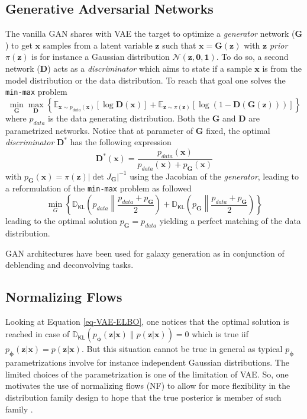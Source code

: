 \documentclass[11pt]{amsart}
\newcommand{\Esp}[0]{\ensuremath{\mathbb{E}}}
\newcommand{\DKL}[0]{\ensuremath{\mathbb{D}_{\mathsf{KL}}}}
\begin{document}
\subsection{Generative Adversarial Networks}
%
The vanilla GAN \citep{goodfellow2014generative} shares with VAE the target to optimize a \textit{generator} network ($\bm{G}$) to get $\bm{x}$ samples from a latent variable $\bm{z}$ such that  $\bm{x} = \bm{G}(\bm{z})$ with $\bm{z}$ \textit{prior} $\pi(\bm{z})$ is for instance a Gaussian distribution $\mathcal{N}(\bm{z},\bm{0},\bm{1})$. To do so, a second network ($\bm{D}$) acts as a \textit{discriminator} which aims to state if a sample $\bm{x}$ is from the model distribution or the data distribution. To reach that goal one solves the \texttt{min-max} problem
\begin{equation}
\min_{\bm{G}} \max_{\bm{D}}\left\{ \Esp_{\bm{x}\sim p_{data}(\bm{x})}[\log \bm{D}(\bm{x})] + \Esp_{\bm{z}\sim \pi(\bm{z})}[\log(1-\bm{D}(\bm{G}(\bm{z})))] \right\}
\end{equation} 
where $p_{data}$ is the data generating distribution. Both the  $\bm{G}$ and $\bm{D}$ are parametrized networks. Notice that at parameter of $\bm{G}$ fixed, the optimal \textit{discriminator} $\bm{D}^\ast$ has the following expression
\begin{equation}
\bm{D}^\ast(\bm{x}) = \frac{p_{data}(\bm{x})}{p_{data}(\bm{x}) + p_{\bm{G}}(\bm{x})}
\end{equation}
with $p_{\bm{G}}(\bm{x}) = \pi(\bm{z})|\det J_{\bm{G}} |^{-1}$ using the Jacobian of the \textit{generator}, leading to a reformulation of the \texttt{min-max} problem as followed
\begin{equation}
\min_G \left\{ \DKL{\left( p_{data} \left\| \frac{p_{data} + p_{\bm{G}}}{2}\right. \right) }  + \DKL{\left(p_{\bm{G}} \left\| \frac{p_{data} + p_{\bm{G}}}{2} \right. \right)} \right\}
\end{equation}
leading to the optimal solution $p_{\bm{G}} = p_{data}$ yielding a perfect matching of the data distribution. 

GAN architectures have been used for galaxy generation as \citep[e.g.][]{Schawinski2017,Coccomini2021,Hemmati_2022} in conjunction of deblending and deconvolving tasks. 
%
\subsection{Normalizing Flows}
%
Looking at Equation \ref{eq-VAE-ELBO}, one notices that the optimal solution is reached in case of $\DKL(p_{\bm{\phi}}(\bm{z}|\bm{x})\| p(\bm{z}|\bm{x}))=0$ which is true iif $p_{\bm{\phi}}(\bm{z}|\bm{x}) = p(\bm{z}|\bm{x})$. But this situation cannot be true in general as typical $p_{\bm{\phi}}$ parametrizations involve for instance independent Gaussian distributions. The limited choices of the parametrization is one of the limitation of VAE. So, one motivates the use of normalizing flows (NF) to allow for more flexibility in the distribution family design to hope that the true posterior is member of such family \citep{Tabak2010, Tabak2013a, Rezende2015}. 
\end{document}
